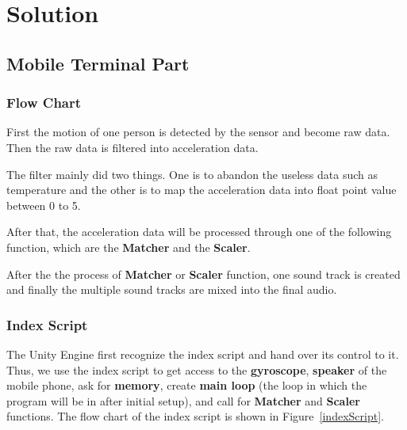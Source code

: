 \section{Solution}

\subsection{Mobile Terminal Part}

\subsubsection{Flow Chart}

   First the motion of one person is detected by the sensor and become raw data.
   Then the raw data is filtered into acceleration data. 

   The filter mainly did two things.
   One is to abandon the useless data such as temperature and the other is to
   map the acceleration data into float point value between 0 to 5. 

   After that, the acceleration data will be processed through one of the
   following function, which are the \textbf{Matcher} and the \textbf{Scaler}. 

   After the the process of \textbf{Matcher} or \textbf{Scaler} function, one
   sound track is created and finally the multiple sound tracks are mixed into
   the final audio. 

\subsubsection{Index Script}

The Unity Engine first recognize the index script and hand over its control to
it.  
Thus, we use the index script to get access to the 
\textbf{gyroscope}, \textbf{speaker} of the mobile phone, 
 ask for \textbf{memory}, create \textbf{main loop} (the loop in which the
 program will be in after initial setup), and call for 
\textbf{Matcher} and \textbf{Scaler} functions. 
The flow chart of the index script is shown in Figure~\ref{indexScript}.



